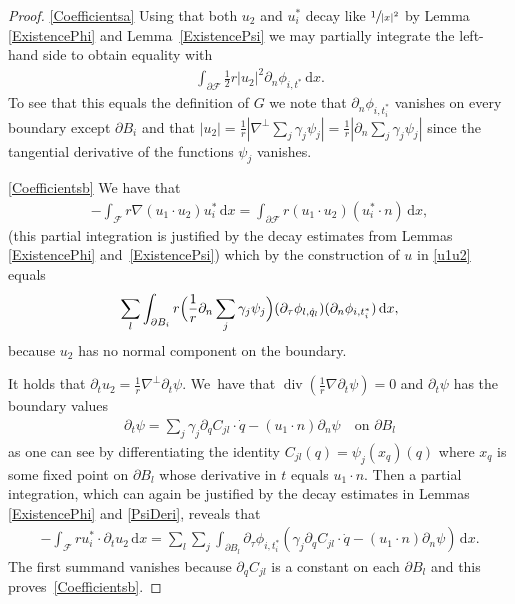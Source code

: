\documentclass[10pt]{amsart}
\newcommand{\skpt}{\par\smallskip\noindent}
\theoremstyle{definition}
\renewcommand{\div}{\operatorname{div}}
\newcommand\eq{=}
\newcommand\dd{\,\mathrm{d}}
\newcommand\dx{\dd x}
\let\de\partial
\begin{document}
\skpt
\begin{proof}

\eqref{Coefficientsa}
Using that both $u_2$ and $u_i^*$ decay like $\sfrac{1}{|x|^2}$ by Lemma \ref{ExistencePhi} and Lemma~\ref{ExistencePsi} we may partially integrate the left-hand side to obtain equality with
\begin{align}
\int_{\de \mathcal{F}}\frac{1}{2}r|u_2|^2\de_n \phi_{i,t^*}\dx.
\end{align}
To see that this equals the definition of $G$ we note that $\de_n \phi_{i,t_i^*}$ vanishes on every boundary except $\de B_i$ and that $|u_2|=\frac{1}{r}|\nabla^\perp\sum_j \gamma_j\psi_j|=\frac{1}{r}|\de_n \sum_j \gamma_j\psi_j|$ since the tangential derivative of the functions $\psi_j$ vanishes.

\eqref{Coefficientsb}
We have that
\begin{align*}
-\int_\mathcal{F} r\nabla(u_1\cdot u_2)u_i^*\dx\eq\int_{\de \mathcal{F}}r(u_1\cdot u_2)(u_i^*\cdot n)\dx,
\end{align*}
(this partial integration is justified by the decay estimates from Lemmas \ref{ExistencePhi} and~\ref{ExistencePsi}) which by the construction of $u$ in \eqref{u1u2} equals
\begin{align*}
\sum_{l}\int_{\de B_i}r\Bigl(\frac{1}{r}\de_n\sum_j\gamma_j\psi_j\Bigr)(\de_\tau \phi_{l,\dot{q}_l})(\de_n \phi_{i,t_i^*})\dx,
\end{align*}
because $u_2$ has no normal component on the boundary.

It holds that $\de_tu_2=\frac{1}{r}\nabla^\perp\de_t\psi$. We~have that $\div(\frac{1}{r}\nabla\de_t\psi)=0$ and $\de_t\psi$ has the boundary values
\begin{align*}
\de_t\psi\eq\sum_j\gamma_j\de_{q} C_{jl}\cdot\dot{q}-(u_1\cdot n)\de_n\psi\quad\text{on $\de B_l$}
\end{align*}
as one can see by differentiating the identity $C_{jl}(q)=\psi_j(x_q)(q)$ where $x_q$ is some fixed point on $\de B_l$ whose derivative in $t$ equals $u_1\cdot n$.
Then a partial integration, which can again be justified by the decay estimates in Lemmas \ref{ExistencePhi} and \ref{PsiDeri}, reveals that
\begin{align*}
-\int_{\mathcal{F}}ru_i^*\cdot\de_tu_2\dx\eq\sum_l\sum_j\int_{\de B_l} \de_\tau\phi_{i,t_i^*}\left(\gamma_j\de_{q} C_{jl}\cdot\dot{q}-(u_1\cdot n)\de_n\psi\right)\dx.
\end{align*}
The first summand vanishes because $\de_q C_{jl}$ is a constant on each $\de B_l$ and this proves~\eqref{Coefficientsb}.


\end{proof}
\end{document}
